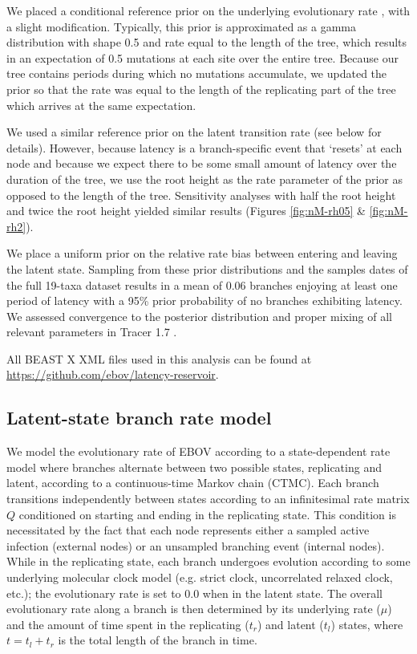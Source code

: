 \documentclass[11pt,a4paper]{article}
\begin{document}
We placed a conditional reference prior on the underlying evolutionary rate \cite{Ferreira2008}, with a slight modification.
Typically, this prior is approximated as a gamma distribution with shape 0.5 and rate equal to the length of the tree, which results in an expectation of 0.5 mutations at each site over the entire tree.
Because our tree contains periods during which no mutations accumulate, we updated the prior so that the rate was equal to the length of the replicating part of the tree which arrives at the same expectation.

We used a similar reference prior on the latent transition rate (see below for details).
However, because latency is a branch-specific event that `resets' at each node and because we expect there to be some small amount of latency over the duration of the tree, we use the root height as the rate parameter of the prior as opposed to the length of the tree.
Sensitivity analyses with half the root height and twice the root height yielded similar results (Figures \ref{fig:nM-rh05} \& \ref{fig:nM-rh2}). 

We place a uniform prior on the relative rate bias between entering and leaving the latent state.
Sampling from these prior distributions and the samples dates of the full 19-taxa dataset results in a mean of 0.06 branches enjoying at least one period of latency with a 95\% prior probability of no branches exhibiting latency.
We assessed convergence to the posterior distribution and proper mixing of all relevant parameters in Tracer 1.7 \cite{Tracer}.

All BEAST X XML files used in this analysis can be found at \url{https://github.com/ebov/latency-reservoir}.

\subsection*{Latent-state branch rate model}

We model the evolutionary rate of EBOV according to a state-dependent rate model \cite{Lewinsohn2022-pf} where branches alternate between two possible states, replicating and latent, according to a continuous-time Markov chain (CTMC).
Each branch transitions independently between states according to an infinitesimal rate matrix $Q$ conditioned on starting and ending in the replicating state.
This condition is necessitated by the fact that each node represents either a sampled active infection (external nodes) or an unsampled branching event (internal nodes).
While in the replicating state, each branch undergoes evolution according to some underlying molecular clock model (e.g. strict clock, uncorrelated relaxed clock, etc.); the evolutionary rate is set to $0.0$ when in the latent state.
The overall evolutionary rate along a branch is then determined by its underlying rate ($\mu$) and the amount of time spent in the replicating ($t_{r}$) and latent ($t_l$) states, where $t=t_l+t_r$ is the total length of the branch in time.
\end{document}
